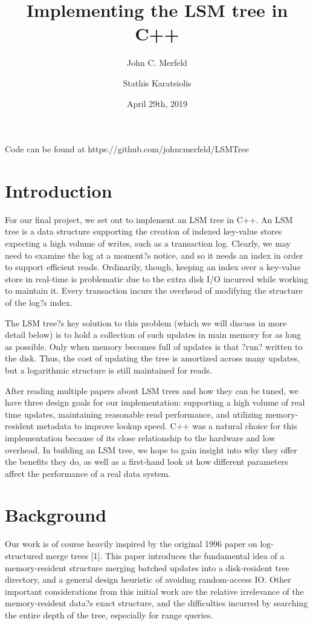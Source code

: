 \documentclass[12pt]{article}
\title{Implementing the LSM tree in C++}
\date{April 29th, 2019}
\author{John C. Merfeld
\and Stathis Karatsiolis}
\begin{document}
\maketitle

Code can be found at https://github.com/johncmerfeld/LSMTree

\section{Introduction}
\indent \indent For our final project, we set out to implement an LSM tree in C++. An LSM tree is a data structure supporting the creation of indexed key-value stores expecting a high volume of writes, such as a transaction log. Clearly, we may need to examine the log at a moment?s notice, and so it needs an index in order to support efficient reads. Ordinarily, though, keeping an index over a key-value store in real-time is problematic due to the extra disk I/O incurred while working to maintain it. Every transaction incurs the overhead of modifying the structure of the log?s index.

The LSM tree?s key solution to this problem (which we will discuss in more detail below) is to hold a collection of such updates in main memory for as long as possible. Only when memory becomes full of updates is that ?run? written to the disk. Thus, the cost of updating the tree is amortized across many updates, but a logarithmic structure is still maintained for reads.

After reading multiple papers about LSM trees and how they can be tuned, we have three design goals for our implementation: supporting a high volume of real time updates, maintaining reasonable read performance, and utilizing memory-resident metadata to improve lookup speed. C++ was a natural choice for this implementation because of its close relationship to the hardware and low overhead. In building an LSM tree, we hope to gain insight into why they offer the benefits they do, as well as a first-hand look at how different parameters affect the performance of a real data system. 

\section{Background}
\indent \indent Our work is of course heavily inspired by the original 1996 paper on log-structured merge trees [1]. This paper introduces the fundamental idea of a memory-resident structure merging batched updates into a disk-resident tree directory, and a general design heuristic of avoiding random-access IO. Other important considerations from this initial work are the relative irrelevance of the memory-resident data?s exact structure, and the difficulties incurred by searching the entire depth of the tree, especially for range queries.
\end{document}
